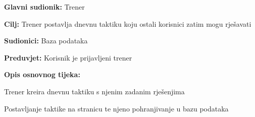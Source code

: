 \documentclass{article}
\begin{document}
		\begin{packed_item}
			
			\item \textbf{Glavni sudionik: }Trener
			\item  \textbf{Cilj:} Trener postavlja dnevnu taktiku koju ostali korisnici zatim mogu rješavati    
			\item  \textbf{Sudionici:} Baza podataka
			\item  \textbf{Preduvjet:} Korisnik je prijavljeni trener 
			\item  \textbf{Opis osnovnog tijeka:}
			
			\item[] \begin{packed_enum}
				\item Trener kreira dnevnu taktiku s njenim zadanim rješenjima  
				\item Postavljanje taktike na stranicu te njeno pohranjivanje u bazu podataka 
			\end{packed_enum}
		\end{packed_item}
		
\end{document}
